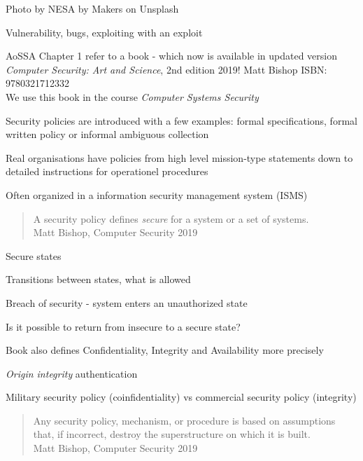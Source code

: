 \documentclass[Screen16to9,17pt]{foils}
\begin{document}
\hfill {\small Photo by NESA by Makers on Unsplash}


Vulnerability, bugs, exploiting with an exploit
\begin{list2}
\item AoSSA Chapter 1 refer to a book - which now is available in updated version\\
\emph{Computer Security: Art and Science}, 2nd edition 2019! Matt Bishop ISBN: 9780321712332\\
We use this book in the course \emph{Computer Systems Security}
\item Security policies are introduced with a few examples: formal specifications, formal written policy or informal ambiguous collection
\item Real organisations have policies from high level mission-type statements down to detailed instructions for operationel procedures
\item Often organized in a information security management system (ISMS)
\end{list2}


\begin{quote}
A security policy defines \emph{secure} for a system or a set of systems.\\
Matt Bishop, Computer Security 2019
\end{quote}

\begin{list1}
\item Secure states
\item Transitions between states, what is allowed
\item Breach of security - system enters an unauthorized state
\item Is it possible to return from insecure to a secure state?
\item Book also defines Confidentiality, Integrity and Availability more precisely
\item \emph{Origin integrity} authentication
\item Military security policy (coinfidentiality) vs commercial security policy (integrity)
\end{list1}


\begin{quote}
Any security policy, mechanism, or procedure is based on assumptions that, if incorrect, destroy the superstructure on which it is built.\\
Matt Bishop, Computer Security 2019
\end{quote}
\end{document}
